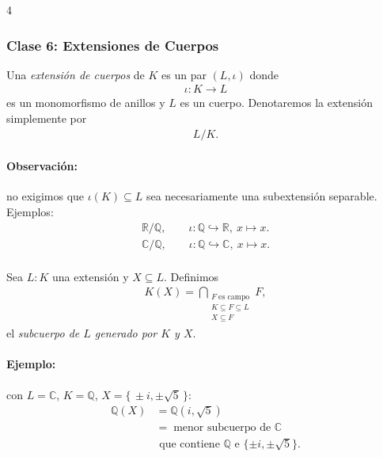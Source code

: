\documentclass[landscape,a4paper]{article}
\begin{document}
\begin{multicols}{4}
\subsubsection*{Clase 6: Extensiones de Cuerpos}
\begin{tcolorbox}[colback=white,colframe=blue!80!black,colbacktitle=blue!80!black,
                  coltitle=white,title={Definición (Extensión de cuerpos)}]
Una \emph{extensión de cuerpos} de $K$ es un par $(L,\iota)$ donde
\begin{align*}
  \iota : K \longrightarrow L
\end{align*}
es un monomorfismo de anillos y $L$ es un cuerpo.  Denotaremos la extensión simplemente por
\begin{align*}
  L/K.
\end{align*}
\end{tcolorbox}
\paragraph{Observación:}no exigimos que \(\iota(K)\subseteq L\) sea necesariamente una subextensión separable.\\[0.3em]
Ejemplos:
\begin{align*}
\mathbb{R}/\mathbb{Q},\qquad \iota:\mathbb{Q}\hookrightarrow\mathbb{R},\ x\mapsto x.\\ 
\mathbb{C}/\mathbb{Q} ,\qquad \iota:\mathbb{Q}\hookrightarrow\mathbb{C},\ x\mapsto x.\\
\end{align*}
\begin{tcolorbox}[colback=white,colframe=blue!80!black,colbacktitle=blue!80!black,
                  coltitle=white,title={Definición}]
Sea $L:K$ una extensión y $X\subseteq L$. Definimos
\begin{align*}
  K(X)=\bigcap_{\substack{F\;\text{es campo}\\K\subseteq F\subseteq L\\ X\subseteq F}}F,
\end{align*}
el \emph{subcuerpo de $L$ generado por $K$ y $X$}.
\end{tcolorbox}
\paragraph{Ejemplo:} con $L=\mathbb{C}$, $K=\mathbb{Q}$, $X=\{\,\pm i,\pm\sqrt{5}\,\}$:
\begin{align*}
\mathbb{Q}(X)&=\mathbb{Q}(i,\sqrt{5})\;\\&=\;\text{menor subcuerpo de }\mathbb{C} \\ &\text{ que contiene }\mathbb{Q}\text{ e } \{\pm i,\pm\sqrt{5}\}.
\end{align*}


\end{multicols}
\end{document}
